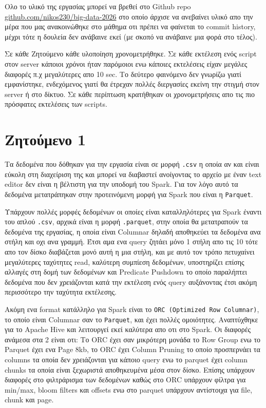 \documentclass[12pt, a4paper]{article}
\begin{document}
Ολο το υλικό της εργασίας μπορεί να βρεθεί στο Github repo \href{https://github.com/nikos230/big-data-2026}{github.com/nikos230/big-data-2026}
στο οποίο άρχισε να ανεβαίνει υλικό απο την μέρα που μας ανακοινώθηκε στο μάθημα οτι πρέπει
να φαίνεται το commit history, μέχρι τότε η δουλεία δεν ανάβαινε εκεί (με σκοπό να ανάβαινε μια
φορά στο τέλος).

Σε κάθε Ζητούμενο κάθε υλοποίηση χρονομετρήθηκε. Σε κάθε εκτέλεση ενός script στον server κάποιοι
χρόνοι ήταν παρόμοιοι ενω κάποιες εκτελέσεις είχαν μεγάλες διαφορές π.χ μεγαλύτερες απο 10 sec. Το δεύτερο 
φαινόμενο δεν γνωρίζω γιατί εμφανίστηκε, ενδεχόμενος γιατί θα έτρεχαν πολλές διεργασίες εκείνη την στιγμή στον
server ή στο δίκτυο. Σε κάθε περίπτωση κρατήθηκαν οι χρονομετρήσεις απο τις 
πιο πρόσφατες εκτελέσεις των scripts.

\section*{Ζητούμενο 1}

Τα δεδομένα που δόθηκαν για την εργασία είναι σε μορφή \texttt{.csv} η οποία αν και είναι
εύκολη στη διαχείριση της και μπορεί να διαβαστεί ανοίγοντας το αρχείο με έναν 
text editor δεν είναι η βέλτιστη για την υποδομή του Spark. Για τον λόγο αυτό
τα δεδομένα μετατράπηκαν στην προτεινόμενη μορφή για Spark που είναι η \texttt{Parquet}.

Υπάρχουν πολλές μορφές δεδομένων οι οποίες είναι καταλληλότερες για Spark έναντι του
απλού \texttt{.csv}, αρχικά είναι η μορφή \texttt{.parquet}, στην οποία θα μετατραπούν
τα δεδομένα της εργασίας, η οποία είναι Columnar δηλαδή αποθηκεύει τα δεδομένα ανα στήλη
και οχι ανα γραμμή. Έτσι αμα ενα query ζητάει μόνο 1 στήλη απο τις 10 τότε απο τον δίσκο
διαβάζεται μονό αυτή η μια στήλη, και με αυτό τον τρόπο πετυχαίνει μεγαλύτερες ταχύτητες 
read, καλύτερη συμπίεση δεδομένων, υποστηρίζει επίσης αλλαγές στη δομή των δεδομένων 
και Predicate Pushdown το οποίο παραλήπτει δεδομένα που δεν χρειάζονται κατά την εκτέλεση 
ενός query αυξάνοντας έτσι ακόμη περισσότερο την ταχύτητα εκτέλεσης. 

Ακόμη ενα format κατάλληλο για Spark είναι το \texttt{ORC (Optimized Row Columnar)},
το οποίο είναι Columnar σαν το \texttt{Parquet}, και έχει πολλές ομοιότητες.
Αναπτύχθηκε για το Apache Hive και λειτουργεί εκεί καλύτερα απο οτι στο Spark. 
Οι διαφορές ανάμεσα στα 2 είναι οτι: Το ORC έχει σαν μικρότερη μονάδα το 
Row Group ενω το Parquet έχει ενα Page 8kb, το ORC έχει Column Pruning το οποίο
προσπερνάει τα columns τα οποία δεν χρειάζονται για κάποιο query ενω το parquet 
έχει column chunks τα οποία είναι ξεχωριστά αποθηκευμένα μέσα στον δίσκο. Επίσης
υπάρχουν διαφορές στο φιλτράρισμα των δεδομένων καθώς στο ORC υπάρχουν φίλτρα για
min/max, bloom filters και offsets ενω στο parquet υπάρχουν αντίστοιχα για 
file, chunk και page.
\end{document}
